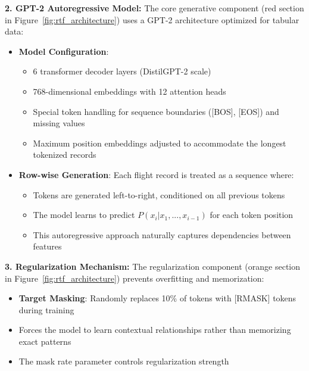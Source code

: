\documentclass[conference]{IEEEtran}
\begin{document}
\textbf{2. GPT-2 Autoregressive Model:} The core generative component (red section in Figure~\ref{fig:rtf_architecture}) uses a GPT-2 architecture optimized for tabular data:
\begin{itemize}
    \item \textbf{Model Configuration}: 
    \begin{itemize}
        \item 6 transformer decoder layers (DistilGPT-2 scale)
        \item 768-dimensional embeddings with 12 attention heads
        \item Special token handling for sequence boundaries ([BOS], [EOS]) and missing values
        \item Maximum position embeddings adjusted to accommodate the longest tokenized records
    \end{itemize}
    \item \textbf{Row-wise Generation}: Each flight record is treated as a sequence where:
    \begin{itemize}
        \item Tokens are generated left-to-right, conditioned on all previous tokens
        \item The model learns to predict $P(x_i | x_1, ..., x_{i-1})$ for each token position
        \item This autoregressive approach naturally captures dependencies between features
    \end{itemize}
\end{itemize}

\textbf{3. Regularization Mechanism:} The regularization component (orange section in Figure~\ref{fig:rtf_architecture}) prevents overfitting and memorization:
\begin{itemize}
    \item \textbf{Target Masking}: Randomly replaces 10\% of tokens with [RMASK] tokens during training
    \item Forces the model to learn contextual relationships rather than memorizing exact patterns
    \item The mask rate parameter controls regularization strength
\end{itemize}
\end{document}
